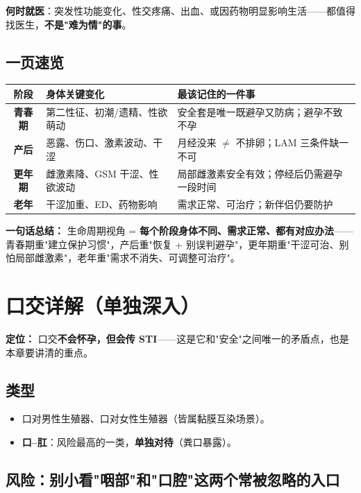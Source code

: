 \documentclass[12pt,UTF8,openany]{ctexbook}
\begin{document}
\textbf{何时就医}：突发性功能变化、性交疼痛、出血、或因药物明显影响生活——都值得找医生，\textbf{不是"难为情"的事}。

\section{一页速览}

\begin{tabularx}{\linewidth}{C X X}
\toprule
\textbf{阶段} & \textbf{身体关键变化} & \textbf{最该记住的一件事} \\
\midrule
\textbf{青春期} & 第二性征、初潮/遗精、性欲萌动 & 安全套是唯一既避孕又防病；避孕不致不孕 \\
\textbf{产后} & 恶露、伤口、激素波动、干涩 & 月经没来 $\ne$ 不排卵；LAM 三条件缺一不可 \\
\textbf{更年期} & 雌激素降、GSM 干涩、性欲波动 & 局部雌激素安全有效；停经后仍需避孕一段时间 \\
\textbf{老年} & 干涩加重、ED、药物影响 & 需求正常、可治疗；新伴侣仍要防护 \\
\bottomrule
\end{tabularx}

\vspace{1em}
\noindent\textbf{一句话总结：} 生命周期视角 = \textbf{每个阶段身体不同、需求正常、都有对应办法}——青春期重"建立保护习惯"，产后重"恢复 + 别误判避孕"，更年期重"干涩可治、别怕局部雌激素"，老年重"需求不消失、可调整可治疗"。

\chapter{口交详解（单独深入）}
\label{chap:oral}

\noindent\textbf{定位：} 口交\textbf{不会怀孕，但会传 STI}——这是它和"安全"之间唯一的矛盾点，也是本章要讲清的重点。

\section{类型}

\begin{itemize}[leftmargin=2em,itemsep=0.3em]
  \item 口对男性生殖器、口对女性生殖器（皆属黏膜互染场景）。
  \item \textbf{口--肛}：风险最高的一类，\textbf{单独对待}（粪口暴露）。
\end{itemize}

\section{风险：别小看"咽部"和"口腔"这两个常被忽略的入口}
\end{document}
